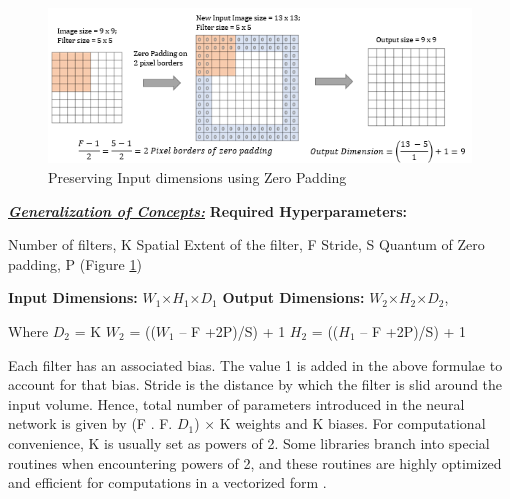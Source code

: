 \begin{figure}[h!]
  \includegraphics[width=\linewidth]{figures/zero_padding_conv.PNG}
  \caption{Preserving Input dimensions using Zero Padding
  \cite{cnn_ytak}}
  \label{fig:zero_padding_conv}
\end{figure}\underline{\textbf{\emph{\large Generalization of Concepts:}}}\newline
\textbf{Required Hyperparameters:}
	\begin{adjustwidth}{2cm}{}
       Number of filters, K \newline
       Spatial Extent of the filter, F \newline
       Stride, S \newline
       Quantum of Zero padding, P (Figure \ref{fig:zero_padding_conv})
	\end{adjustwidth}
\textbf{Input Dimensions:} $W_1$×$H_1$×$D_1$ \newline
\textbf{Output Dimensions:} $W_2$×$H_2$×$D_2$, 
	\begin{adjustwidth}{2cm}{}
      Where \newline 
	  $D_2$ = K \newline
	  $W_2$ = (($W_1$ – F +2P)/S) + 1 \newline
	  $H_2$ = (($H_1$ – F +2P)/S) + 1 \newline
    \end{adjustwidth}
Each filter has an associated bias. The value 1 is added in the above formulae to account for that bias. Stride is the distance by which the filter is slid around the input volume.\newline
Hence, total number of parameters introduced in the neural network is given by (F . F. $D_1$) × K weights and K biases. For computational convenience, K is usually set as powers of 2. Some libraries branch into special routines when encountering powers of 2, and these routines are highly optimized and efficient for computations in a vectorized form \cite{cnn_ytak}. \newline \newline
